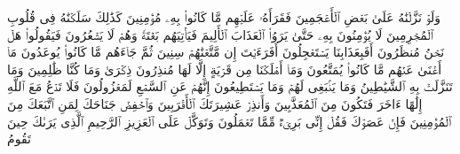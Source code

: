 \stopbuffer%
\startbuffer[\q:26:198]
وَلَوۡ نَزَّلۡنَٰهُ عَلَىٰ بَعۡضِ ٱلۡأَعۡجَمِینَ%
\stopbuffer%
\startbuffer[\q:26:199]
فَقَرَأَهُۥ عَلَیۡهِم مَّا كَانُوا۟ بِهِۦ مُؤۡمِنِینَ%
\stopbuffer%
\startbuffer[\q:26:200]
كَذَٰلِكَ سَلَكۡنَٰهُ فِی قُلُوبِ ٱلۡمُجۡرِمِینَ%
\stopbuffer%
\startbuffer[\q:26:201]
لَا یُؤۡمِنُونَ بِهِۦ حَتَّىٰ یَرَوُا۟ ٱلۡعَذَابَ ٱلۡأَلِیمَ%
\stopbuffer%
\startbuffer[\q:26:202]
فَیَأۡتِیَهُم بَغۡتَةࣰ وَهُمۡ لَا یَشۡعُرُونَ%
\stopbuffer%
\startbuffer[\q:26:203]
فَیَقُولُوا۟ هَلۡ نَحۡنُ مُنظَرُونَ%
\stopbuffer%
\startbuffer[\q:26:204]
أَفَبِعَذَابِنَا یَسۡتَعۡجِلُونَ%
\stopbuffer%
\startbuffer[\q:26:205]
أَفَرَءَیۡتَ إِن مَّتَّعۡنَٰهُمۡ سِنِینَ%
\stopbuffer%
\startbuffer[\q:26:206]
ثُمَّ جَاۤءَهُم مَّا كَانُوا۟ یُوعَدُونَ%
\stopbuffer%
\startbuffer[\q:26:207]
مَاۤ أَغۡنَىٰ عَنۡهُم مَّا كَانُوا۟ یُمَتَّعُونَ%
\stopbuffer%
\startbuffer[\q:26:208]
وَمَاۤ أَهۡلَكۡنَا مِن قَرۡیَةٍ إِلَّا لَهَا مُنذِرُونَ%
\stopbuffer%
\startbuffer[\q:26:209]
ذِكۡرَىٰ وَمَا كُنَّا ظَٰلِمِینَ%
\stopbuffer%
\startbuffer[\q:26:210]
وَمَا تَنَزَّلَتۡ بِهِ ٱلشَّیَٰطِینُ%
\stopbuffer%
\startbuffer[\q:26:211]
وَمَا یَنۢبَغِی لَهُمۡ وَمَا یَسۡتَطِیعُونَ%
\stopbuffer%
\startbuffer[\q:26:212]
إِنَّهُمۡ عَنِ ٱلسَّمۡعِ لَمَعۡزُولُونَ%
\stopbuffer%
\startbuffer[\q:26:213]
فَلَا تَدۡعُ مَعَ ٱللَّهِ إِلَٰهًا ءَاخَرَ فَتَكُونَ مِنَ ٱلۡمُعَذَّبِینَ%
\stopbuffer%
\startbuffer[\q:26:214]
وَأَنذِرۡ عَشِیرَتَكَ ٱلۡأَقۡرَبِینَ%
\stopbuffer%
\startbuffer[\q:26:215]
وَٱخۡفِضۡ جَنَاحَكَ لِمَنِ ٱتَّبَعَكَ مِنَ ٱلۡمُؤۡمِنِینَ%
\stopbuffer%
\startbuffer[\q:26:216]
فَإِنۡ عَصَوۡكَ فَقُلۡ إِنِّی بَرِیۤءࣱ مِّمَّا تَعۡمَلُونَ%
\stopbuffer%
\startbuffer[\q:26:217]
وَتَوَكَّلۡ عَلَى ٱلۡعَزِیزِ ٱلرَّحِیمِ%
\stopbuffer%
\startbuffer[\q:26:218]
ٱلَّذِی یَرَىٰكَ حِینَ تَقُومُ%
\stopbuffer%
